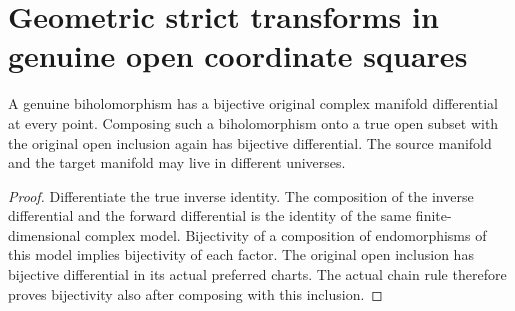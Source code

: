 \section{Geometric strict transforms in genuine open coordinate squares}

\begin{lemma}
\label{hir:actual-open-coordinate-embedding-differential}
\leanok
A genuine biholomorphism has a bijective original complex manifold
differential at every point. Composing such a biholomorphism onto a true
open subset with the original open inclusion again has bijective
differential. The source manifold and the target manifold may live in
different universes.
\end{lemma}
\begin{proof}
Differentiate the true inverse identity. The composition of the inverse
differential and the forward differential is the identity of the same
finite-dimensional complex model. Bijectivity of a composition of
endomorphisms of this model implies bijectivity of each factor. The
original open inclusion has bijective differential in its actual
preferred charts. The actual chain rule therefore proves bijectivity
also after composing with this inclusion.
\end{proof}

